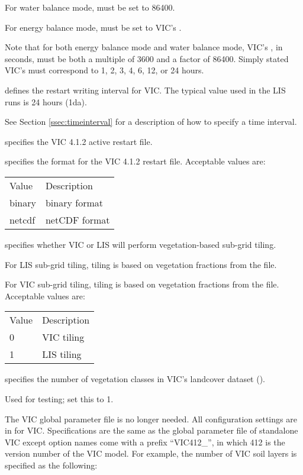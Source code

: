  For water balance mode, 
 must be set to 86400.

 For energy balance mode, 
 must be set to VIC's .

 Note that for both energy balance mode and water balance mode,
 VIC's , in seconds, must be both a
 multiple of 3600 and a factor of 86400.
 Simply stated VIC's  must
 correspond to 1, 2, 3, 4, 6, 12, or 24 hours.

  defines the restart
 writing interval for VIC. The typical value used in the
 LIS runs is 24 hours (1da).

 See Section \ref{ssec:timeinterval} for a description
 of how to specify a time interval.

  specifies the VIC 4.1.2 active
 restart file.

  specifies the format for the
 VIC 4.1.2 restart file.
 Acceptable values are:
 \begin{tabular}{ll}
 Value  & Description   \\
 binary & binary format \\
 netcdf & netCDF format \\
 \end{tabular}

  specifies whether VIC or LIS
 will perform vegetation-based sub-grid tiling.

 For LIS sub-grid tiling, tiling is based on vegetation fractions
 from the  file.

 For VIC sub-grid tiling, tiling is based on vegetation fractions
 from the  file.
 Acceptable values are:

 \begin{tabular}{ll}
 Value & Description \\
 0     & VIC tiling  \\
 1     & LIS tiling  \\
 \end{tabular}

  specifies the
 number of vegetation classes in VIC's landcover dataset
 ().

  Used for testing; set this to 1.

 The VIC global parameter file is no longer needed. All configuration
 settings are in  for VIC. Specifications are the same
 as the global parameter file of standalone VIC except option names
 come with a prefix ``VIC412\_'', in which 412 is the version number
 of the VIC model. For example, the number of VIC soil layers is
 specified as the following:

